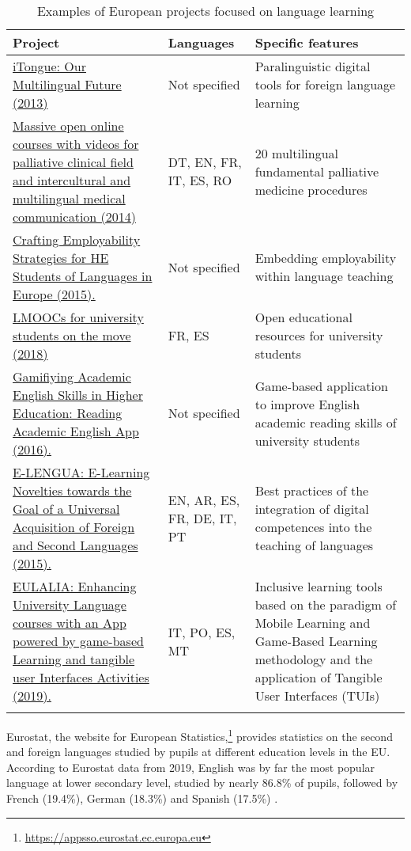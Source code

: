 \documentclass[output=paper]{langscibook}
\begin{document}
\begin{table}
\small
\begin{tabularx}{\textwidth}{Qp{2.5cm}Q}
\lsptoprule
{Project} & {Languages} & {Specific features}\\
\midrule
\href{https://www.itongue.eu/}{{iTongue: Our Multilingual Future (2013)}} & Not specified & Paralinguistic digital tools for foreign language learning\\
\tablevspace
\href{http://medlang.eu/videos.php}{{Massive open online courses with videos for palliative clinical field and intercultural and multilingual medical communication (2014)}} & DT, EN, FR, IT, ES, RO & 20 multilingual fundamental palliative medicine procedures\\
\tablevspace
\href{https://languages4work.eu/}{{Crafting Employability Strategies for HE Students of Languages in Europe (2015).}} & Not specified & Embedding employability within language teaching\\
\tablevspace
\href{http://www.mooc2move.eu/}{{LMOOCs for university students on the move (2018)}} & FR, ES & Open educational resources for university students\\
\tablevspace
\href{http://stratapp.eu/}{{Gamifiying Academic English Skills in Higher Education: Reading Academic English App (2016).}} & Not specified & Game-based application to improve English academic reading skills of university students\\
\tablevspace
\href{http://elengua.usal.es/}{{E-LENGUA: E-Learning Novelties towards the Goal of a Universal Acquisition of Foreign and Second Languages (2015).}} & EN, AR, ES, FR, DE, IT,  PT & Best practices of the integration of digital competences into the teaching of languages\\
\tablevspace
\href{https://eulaliaproject.eu/es/}{{EULALIA: Enhancing University Language courses with an App powered by game-based Learning and tangible user Interfaces Activities (2019).}} & IT, PO, ES, MT & Inclusive learning tools based on the paradigm of Mobile Learning and Game-Based Learning methodology and the application of Tangible User Interfaces (TUIs)\\
\tablevspace
\lspbottomrule
\end{tabularx}
\caption{Examples of European projects focused on language learning}
\label{tab:torres:2}
\end{table}

Eurostat, the website for European Statistics,\footnote{\url{https://appsso.eurostat.ec.europa.eu}} provides statistics on the second and foreign languages studied by pupils at different education levels in the EU. According to Eurostat data from 2019, English was by far the most popular language at lower secondary level, studied by nearly 86.8\% of pupils, followed by French (19.4\%), German (18.3\%) and Spanish (17.5\%) \citep{Eurostat2022}.
\end{document}
